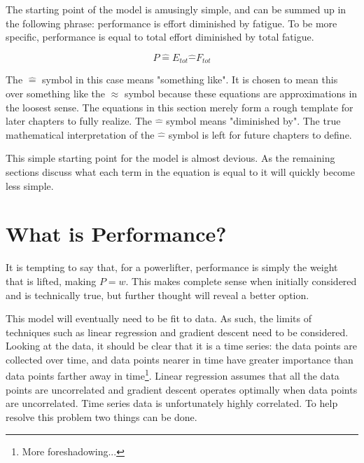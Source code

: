 The starting point of the model is amusingly simple, and can be summed up in the following phrase: performance is effort diminished by fatigue. To be more specific, performance is equal to total effort diminished by total fatigue. 

\begin{equation}
	\label{eq:P2C1_EffortFatigue}
	P \hat{=} E_{tot}\hat{-}F_{tot}
\end{equation}

The $\hat{=}$ symbol in this case means "something like". It is chosen to mean this over something like the $\approx$ symbol because these equations are approximations in the loosest sense. The equations in this section merely form a rough template for later chapters to fully realize. The $\hat{-}$ symbol means "diminished by". The true mathematical interpretation of the $\hat{-}$ symbol is left for future chapters to define.

This simple starting point for the model is almost devious. As the remaining sections discuss what each term in the equation is equal to it will quickly become less simple.

\section{What is Performance?}
\label{sec:P2C1_WhatIsPerformance}

It is tempting to say that, for a powerlifter, performance is simply the weight that is lifted, making $P=w$. This makes complete sense when initially considered and is technically true, but further thought will reveal a better option.

This model will eventually need to be fit to data. As such, the limits of techniques such as linear regression and gradient descent need to be considered. Looking at the data, it should be clear that it is a time series: the data points are collected over time, and data points nearer in time have greater importance than data points farther away in time\footnote{More foreshadowing...}. Linear regression assumes that all the data points are uncorrelated and gradient descent operates optimally when data points are uncorrelated. Time series data is unfortunately highly correlated. To help resolve this problem two things can be done.


